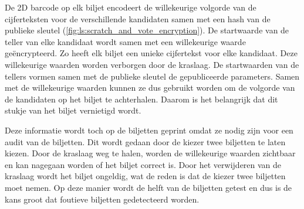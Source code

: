 \npar De 2D barcode op elk biljet encodeert de willekeurige volgorde van de cijferteksten voor de verschillende kandidaten samen met een hash van de publieke sleutel (\ref{fig:ls:scratch_and_vote_encryption}). De startwaarde van de teller van elke kandidaat wordt samen met een willekeurige waarde ge\"encrypteerd. Zo heeft elk biljet een unieke cijfertekst voor elke kandidaat. Deze willekeurige waarden worden verborgen door de kraslaag. De startwaarden van de tellers vormen samen met de publieke sleutel de gepubliceerde parameters. Samen met de willekeurige waarden kunnen ze dus gebruikt worden om de volgorde van de kandidaten op het biljet te achterhalen. Daarom is het belangrijk dat dit stukje van het biljet vernietigd wordt.

\npar Deze informatie wordt toch op de biljetten geprint omdat ze nodig zijn voor een audit van de biljetten. Dit wordt gedaan door de kiezer twee biljetten te laten kiezen. Door de kraslaag weg te halen, worden de willekeurige waarden zichtbaar en kan nagegaan worden of het biljet correct is. Door het verwijderen van de kraslaag wordt het biljet ongeldig, wat de reden is dat de kiezer twee biljetten moet nemen. Op deze manier wordt de helft van de biljetten getest en dus is de kans groot dat foutieve biljetten gedetecteerd worden.
